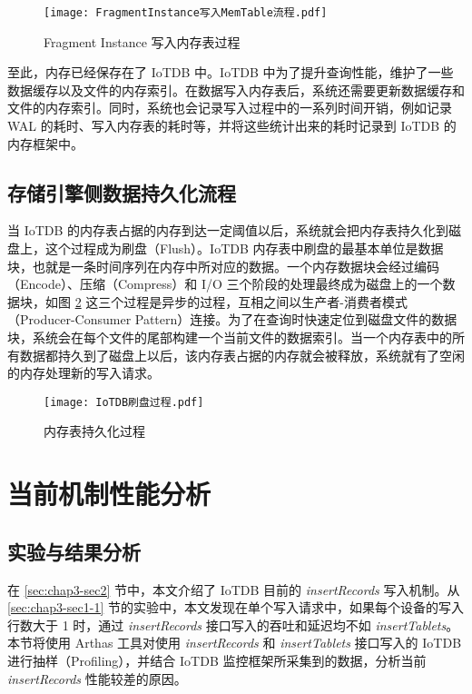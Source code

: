 \begin{figure}
  \centering
  \texttt{[image: FragmentInstance写入MemTable流程.pdf]}
  \caption{Fragment Instance 写入内存表过程}
  \label{fig:fragment-instance-insert-to-memtable}
\end{figure}

至此，内存已经保存在了 IoTDB 中。IoTDB 中为了提升查询性能，维护了一些数据缓存以及文件的内存索引。在数据写入内存表后，系统还需要更新数据缓存和文件的内存索引。同时，系统也会记录写入过程中的一系列时间开销，例如记录 WAL 的耗时、写入内存表的耗时等，并将这些统计出来的耗时记录到 IoTDB 的内存框架中。
\subsection{存储引擎侧数据持久化流程}
当 IoTDB 的内存表占据的内存到达一定阈值以后，系统就会把内存表持久化到磁盘上，这个过程成为刷盘（Flush）。IoTDB 内存表中刷盘的最基本单位是数据块，也就是一条时间序列在内存中所对应的数据。一个内存数据块会经过编码（Encode）、压缩（Compress）和 I/O 三个阶段的处理最终成为磁盘上的一个数据块，如图 \ref{fig:memtable-flush} 这三个过程是异步的过程，互相之间以生产者-消费者模式（Producer-Consumer Pattern）连接。为了在查询时快速定位到磁盘文件的数据块，系统会在每个文件的尾部构建一个当前文件的数据索引。当一个内存表中的所有数据都持久到了磁盘上以后，该内存表占据的内存就会被释放，系统就有了空闲的内存处理新的写入请求。

\begin{figure}
  \centering
  \texttt{[image: IoTDB刷盘过程.pdf]}
  \caption{内存表持久化过程}
  \label{fig:memtable-flush}
\end{figure}

\section{当前机制性能分析}
\subsection{实验与结果分析\label{sec:chap3-sec3-1}}
在 \ref{sec:chap3-sec2} 节中，本文介绍了 IoTDB 目前的 \emph{insertRecords} 写入机制。从 \ref{sec:chap3-sec1-1} 节的实验中，本文发现在单个写入请求中，如果每个设备的写入行数大于 1 时，通过 \emph{insertRecords} 接口写入的吞吐和延迟均不如 \emph{insertTablets}。本节将使用 Arthas 工具对使用 \emph{insertRecords} 和 \emph{insertTablets} 接口写入的 IoTDB 进行抽样（Profiling），并结合 IoTDB 监控框架所采集到的数据，分析当前 \emph{insertRecords} 性能较差的原因。


